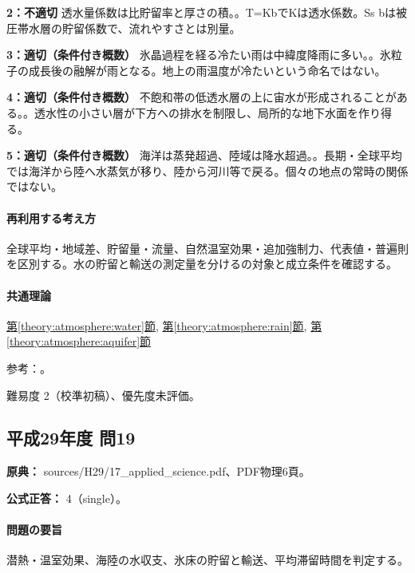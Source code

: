 \noindent\textbf{2：不適切} 透水量係数は比貯留率と厚さの積。。T=\allowbreak{}KbでKは透水係数。Ss bは被圧帯水層の貯留係数で、流れやすさとは別量。\par

\noindent\textbf{3：適切（条件付き概数）} 氷晶過程を経る冷たい雨は中緯度降雨に多い。。氷粒子の成長後の融解が雨となる。地上の雨温度が冷たいという命名ではない。\par

\noindent\textbf{4：適切（条件付き概数）} 不飽和帯の低透水層の上に宙水が形成されることがある。。透水性の小さい層が下方への排水を制限し、局所的な地下水面を作り得る。\par

\noindent\textbf{5：適切（条件付き概数）} 海洋は蒸発超過、陸域は降水超過。。長期・全球平均では海洋から陸へ水蒸気が移り、陸から河川等で戻る。個々の地点の常時の関係ではない。\par

\paragraph{再利用する考え方} 全球平均・地域差、貯留量・流量、自然温室効果・追加強制力、代表値・普遍則を区別する。水の貯留と輸送の測定量を分けるの対象と成立条件を確認する。

\paragraph{共通理論} \hyperref[theory:atmosphere:water]{第\ref*{theory:atmosphere:water}節}, \hyperref[theory:atmosphere:rain]{第\ref*{theory:atmosphere:rain}節}, \hyperref[theory:atmosphere:aquifer]{第\ref*{theory:atmosphere:aquifer}節}

\par 参考：\cite{atm_noaa_pwat,atm_mri_cloud,atm_usgs_transmissivity,atm_usgs_perched}。

\par 難易度 2（校準初稿）、優先度未評価。

\subsection{平成29年度 問19}
\label{q:h29-reg-applied-19}

\noindent\textbf{原典：} sources/H29/17\_applied\_science.pdf、PDF物理6頁。

\textbf{公式正答：} 4（single）。

\paragraph{問題の要旨} 潜熱・温室効果、海陸の水収支、氷床の貯留と輸送、平均滞留時間を判定する。

